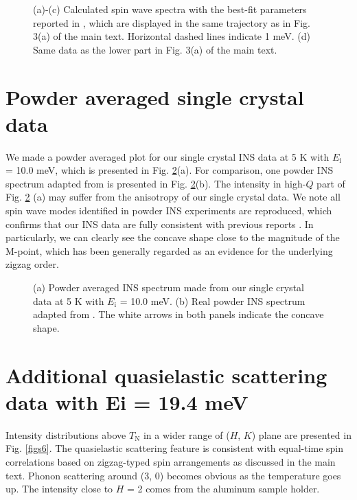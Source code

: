 \documentclass[%
reprint,
superscriptaddress,
amsmath,amssymb,
aps,
prb,
]{revtex4-2}
\begin{document}
	\begin{figure}[h]
		\caption{(a)-(c) Calculated spin wave spectra with the best-fit parameters reported in \cite{SongvilayPRB2020,LinNC2021,KimJPCM2021}, which are displayed in the same trajectory as in Fig. 3(a) of the main text. Horizontal dashed lines indicate 1 meV. (d) Same data as the lower part in Fig. 3(a) of the main text.}
	\label{figs4}
	\end{figure}
	
	\section{Powder averaged single crystal data}
	
	We made a powder averaged plot for our single crystal INS data at 5 K with $E_\mathrm{i}$ = 10.0 meV, which is presented in Fig. \ref{figs5}(a). For comparison, one powder INS spectrum adapted from \cite{LinNC2021} is presented in Fig. \ref{figs5}(b). The intensity in high-$Q$ part of Fig. \ref{figs5} (a) may suffer from the anisotropy of our single crystal data. We note all spin wave modes identified in powder INS experiments are reproduced, which confirms that our INS data are fully consistent with previous reports \cite{SongvilayPRB2020,LinNC2021,SamarakoonPRB2021,KimJPCM2021,SandersArxiv2021}. In particularly, we can clearly see the concave shape close to the magnitude of the M-point, which has been generally regarded as an evidence for the underlying zigzag order.

	\begin{figure}[h!]
		\caption{(a) Powder averaged INS spectrum made from our single crystal data at 5 K with $E_\mathrm{i}$ = 10.0 meV. (b) Real powder INS spectrum adapted from \cite{LinNC2021}. The white arrows in both panels indicate the concave shape.}
		\label{figs5}
	\end{figure}
	
	\section{Additional quasielastic scattering data with Ei = 19.4 meV}
	
	Intensity distributions above $T_\mathrm{N}$ in a wider range of ($H$, $K$) plane are presented in Fig. \ref{figs6}. The quasielastic scattering feature is consistent with equal-time spin correlations based on zigzag-typed spin arrangements as discussed in the main text. Phonon scattering around (3, 0) becomes obvious as the temperature goes up. The intensity close to $H$ = 2 comes from the aluminum sample holder.
	
\end{document}
